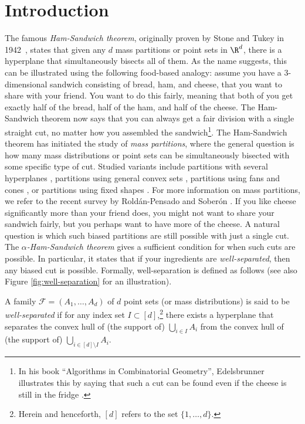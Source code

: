 \section{Introduction}
\label{sec:intro}
%
The famous \emph{Ham-Sandwich theorem}, originally proven by Stone and Tukey in 1942~\cite{StoneTukey}, states that given any $d$ mass partitions or point sets in $\R^d$, there is a hyperplane that simultaneously bisects all of them. As the name suggests, this can be illustrated using the following food-based analogy: assume you have a 3-dimensional sandwich consisting of bread, ham, and cheese, that you want to share with your friend. You want to do this fairly, meaning that both of you get exactly half of the bread, half of the ham, and half of the cheese. The Ham-Sandwich theorem now says that you can always get a fair division with a single straight cut, no matter how you assembled the sandwich\footnote{In his book ``Algorithms in Combinatorial Geometry'', Edelsbrunner illustrates this by saying that such a cut can be found even if the cheese is still in the fridge \cite{EdelsbrunnerBook}.}.
%
The Ham-Sandwich theorem has initiated the study of \emph{mass partitions}, where the general question is how many mass distributions or point sets can be simultaneously bisected with some specific type of cut. Studied variants include partitions with several hyperplanes \cite{Barba2019,Blagojevic2022,Hubard2020,Hubard2024,Schnider2021}, partitions using general convex sets \cite{Aichholzer:2018gu,Akopyan:2013jt,Blagojevic:2007ij}, partitions using fans and cones \cite{Barany:2002tk,Schnider2019,Soberon2023}, or partitions using fixed shapes \cite{cookie_cutters}. For more information on mass partitions, we refer to the recent survey by Rold\'{a}n-Pensado and Sober\'{o}n \cite{RoldanPensado2022}.
%
If you like cheese significantly more than your friend does, you might not want to share your sandwich fairly, but you perhaps want to have more of the cheese. A natural question is which such biased partitions are still possible with just a single cut. The \emph{$\alpha$-Ham-Sandwich theorem} gives a sufficient condition for when such cuts are possible. In particular, it states that if your ingredients are \emph{well-separated}, then any biased cut is possible. Formally, well-separation is defined as follows (see also Figure \ref{fig:well-separation} for an illustration).
%
\begin{definition}
    A family $\mathcal{F}=(A_1,\ldots,A_d)$ of $d$ point sets (or mass distributions) is said to be \emph{well-separated} if for any index set $I \subset [d]$,\footnote{Herein and henceforth, $[d]$ refers to the set $\{1, \dots, d\}$.} there exists a hyperplane that separates the convex hull of (the support of) $\bigcup_{i\in I}A_i$ from the convex hull of (the support of) $\bigcup_{i\in [d]\setminus I}A_i$.
\end{definition}
